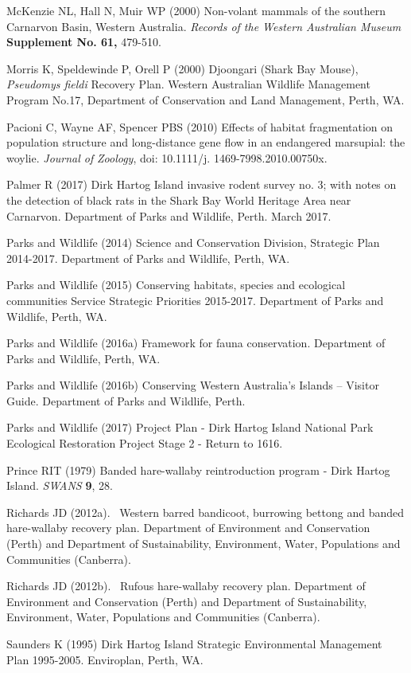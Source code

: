 \documentclass[version=last,
    paper=a4,                               %
    10pt,                                   %
    dvipsnames,
    oneside,                              %
    headings=openany,                       %
    open=any,
    BCOR=7mm,                               %
    DIV=15,     %
]{scrbook}
\begin{document}
McKenzie NL, Hall N, Muir WP (2000) Non-volant mammals of the southern
Carnarvon Basin, Western Australia. \emph{Records of the Western
Australian Museum} \textbf{Supplement No. 61,} 479-510.

Morris K, Speldewinde P, Orell P (2000) Djoongari (Shark Bay Mouse),
\emph{Pseudomys fieldi} Recovery Plan. Western Australian Wildlife
Management Program No.17, Department of Conservation and Land
Management, Perth, WA.

Pacioni C, Wayne AF, Spencer PBS (2010) Effects of habitat fragmentation
on population structure and long-distance gene flow in an endangered
marsupial: the woylie. \emph{Journal of} \emph{Zoology}, doi: 10.1111/j.
1469-7998.2010.00750x.

Palmer R (2017) Dirk Hartog Island invasive rodent survey no. 3; with
notes on the detection of black rats in the Shark Bay World Heritage
Area near Carnarvon. Department of Parks and Wildlife, Perth. March
2017.

Parks and Wildlife (2014) Science and Conservation Division, Strategic
Plan 2014-2017. Department of Parks and Wildlife, Perth, WA.

Parks and Wildlife (2015) Conserving habitats, species and ecological
communities Service Strategic Priorities 2015-2017. Department of Parks
and Wildlife, Perth, WA.

Parks and Wildlife (2016a) Framework for fauna conservation. Department
of Parks and Wildlife, Perth, WA.

Parks and Wildlife (2016b) Conserving Western Australia's Islands --
Visitor Guide. Department of Parks and Wildlife, Perth.

Parks and Wildlife (2017) Project Plan - Dirk Hartog Island National
Park Ecological Restoration Project Stage 2 - Return to 1616.~

Prince RIT (1979) Banded hare-wallaby reintroduction program - Dirk
Hartog Island. \emph{SWANS} \textbf{9}, 28.

Richards JD (2012a).~ Western barred bandicoot, burrowing bettong and
banded hare-wallaby recovery plan. Department of Environment and
Conservation (Perth) and Department of Sustainability, Environment,
Water, Populations and Communities (Canberra).

Richards JD (2012b).~ Rufous hare-wallaby recovery plan. Department of
Environment and Conservation (Perth) and Department of Sustainability,
Environment, Water, Populations and Communities (Canberra).

Saunders K (1995) Dirk Hartog Island Strategic Environmental Management
Plan 1995-2005. Enviroplan, Perth, WA.
\end{document}
